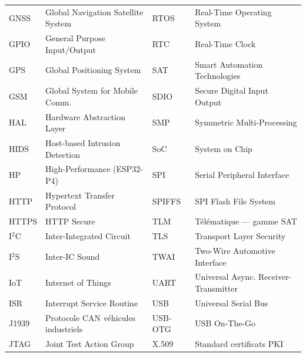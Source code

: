 \begin{longtable}{p{1.75cm}p{5.85cm}p{1.75cm}p{5.85cm}}
GNSS     & Global Navigation Satellite System   & RTOS    & Real-Time Operating System\\
GPIO     & General Purpose Input/Output         & RTC     & Real-Time Clock\\
GPS      & Global Positioning System            & SAT     & Smart Automation Technologies\\
GSM      & Global System for Mobile Comm.       & SDIO    & Secure Digital Input Output\\
HAL      & Hardware Abstraction Layer           & SMP     & Symmetric Multi-Processing\\
HIDS     & Host-based Intrusion Detection       & SoC     & System on Chip\\
HP       & High-Performance (ESP32-P4)          & SPI     & Serial Peripheral Interface\\
HTTP     & Hypertext Transfer Protocol          & SPIFFS  & SPI Flash File System\\
HTTPS    & HTTP Secure                          & TLM     & Télématique --- gamme SAT\\
I$^2$C   & Inter-Integrated Circuit             & TLS     & Transport Layer Security\\
I$^2$S   & Inter-IC Sound                       & TWAI    & Two-Wire Automotive Interface\\
IoT      & Internet of Things                   & UART    & Universal Async. Receiver-Transmitter\\
ISR      & Interrupt Service Routine            & USB     & Universal Serial Bus\\
J1939    & Protocole CAN véhicules industriels  & USB-OTG & USB On-The-Go\\
JTAG     & Joint Test Action Group              & X.509   & Standard certificats PKI\\
\end{longtable}
\newpage